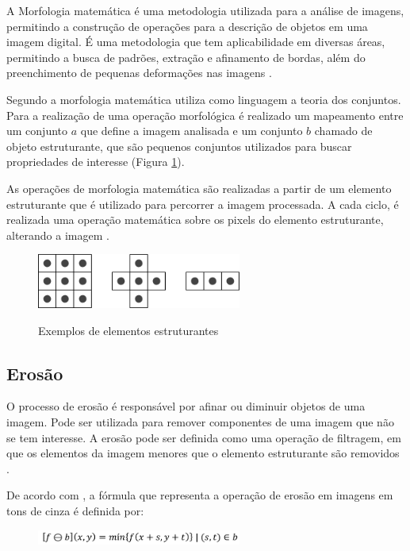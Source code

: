 \documentclass[
	12pt,				%
	oneside,			%
	a4paper,			%
	english,			%
	french,				%
	spanish,			%
	brazil,				%
	]{abntex2}
\begin{document}
A Morfologia matemática é uma metodologia utilizada para a análise de imagens, permitindo a construção de operações para a descrição de objetos em uma imagem digital.  É uma metodologia que tem aplicabilidade em diversas áreas, permitindo a busca de padrões, extração e afinamento de bordas, além do preenchimento de pequenas deformações nas imagens \cite{pedriniSchwartz:2008}.

Segundo \citet{gonzalesWoods:2008} a morfologia matemática utiliza como linguagem a teoria dos conjuntos. Para a realização de uma operação morfológica é realizado um mapeamento entre um conjunto \(a\) que define a imagem analisada e um conjunto \(b\) chamado de objeto estruturante, que são pequenos conjuntos utilizados para buscar propriedades de interesse (Figura \ref{fig:elementro_estruturante}). 

As operações de morfologia matemática são realizadas a partir de um elemento estruturante que é utilizado para percorrer a imagem processada. A cada ciclo, é realizada uma operação matemática sobre os pixels do elemento estruturante, alterando a imagem \cite{pedriniSchwartz:2008}.

\begin{figure}[ht]
\centering
\caption{Exemplos de elementos estruturantes}
\includegraphics[width=0.6\textwidth]{imagens/elemento_estruturante.png}
\sourceAuthor
\label{fig:elementro_estruturante}
\end{figure}

\subsection{Erosão}
O processo de erosão é responsável por afinar ou diminuir objetos de uma imagem. Pode ser utilizada para remover componentes de uma imagem que não se tem interesse. A erosão pode ser definida como uma operação de filtragem, em que os elementos da imagem menores que o elemento estruturante são removidos \cite{gonzalesWoods:2008}.

De acordo com \citet{pedriniSchwartz:2008}, a fórmula que representa a operação de erosão em imagens em tons de cinza é definida por:

\begin{figure}[ht]
\centering
\includegraphics[width=0.6\textwidth]{imagens/erosao_formula.png}
\end{figure}
\end{document}

